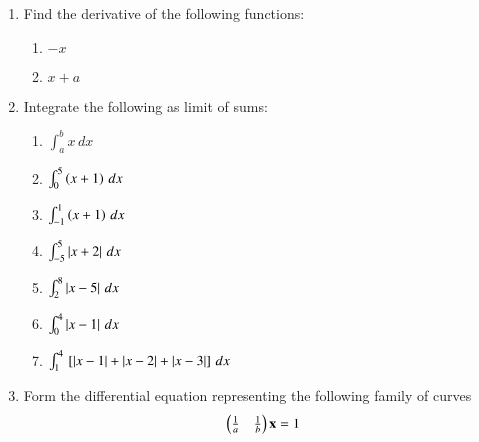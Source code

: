 \begin{enumerate}[label=\arabic*.,ref=\thesubsection.\theenumi]
\item Find the derivative of the following functions:
%
\begin{enumerate}
\item  $-x$
\item  $x+a$
\end{enumerate}
%
\item Integrate the following as limit of sums:
\begin{enumerate}[label = (\roman*)]
\item $\int_{a}^{b}x\, dx$
\item $\int_{0}^{5}\left(x+1\right)\, dx$
\item $\int_{-1}^{1}\left(x+1\right)\, dx$
\item $\int_{-5}^{5}\left\vert x+2\right\vert\, dx$
\item $\int_{2}^{8}\left\vert x-5\right\vert\, dx$
\item $\int_{0}^{4}\left\vert x-1\right\vert\, dx$
\item $\int_{1}^{4}{}\left[\left\vert x-1\right\vert+\left\vert x-2\right\vert+\left\vert x-3\right\vert\right]\, dx$
\end{enumerate}
%
\item Form the differential equation representing the following family of curves 
\begin{align}
\begin{pmatrix}\frac{1}{a} & \frac{1}{b}\end{pmatrix}\mathbf{x} = 1
\end{align}
%

\end{enumerate}
